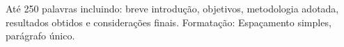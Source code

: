 Até 250 palavras incluindo: breve introdução, objetivos, metodologia adotada, resultados obtidos e considerações finais. Formatação: Espaçamento simples, parágrafo único.
